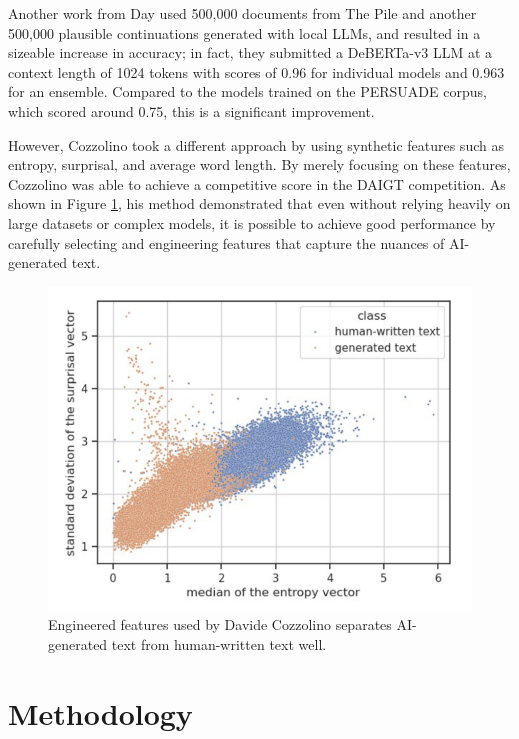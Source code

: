 \documentclass[conference]{IEEEtran}
\begin{document}
Another work from Day \cite{5thplace} used 500,000 documents from The Pile and another 500,000 plausible continuations generated with local LLMs, and resulted in a sizeable increase in accuracy; in fact, they submitted a DeBERTa-v3 LLM at a context length of 1024 tokens with scores of 0.96 for individual models and 0.963 for an ensemble. Compared to the models trained on the PERSUADE corpus, which scored around 0.75, this is a significant improvement.

However, Cozzolino \cite{6thplace} took a different approach by using synthetic features such as entropy, surprisal, and average word length. By merely focusing on these features, Cozzolino was able to achieve a competitive score in the DAIGT competition. As shown in Figure \ref{fig:cozzolino}, his method demonstrated that even without relying heavily on large datasets or complex models, it is possible to achieve good performance by carefully selecting and engineering features that capture the nuances of AI-generated text.

\begin{figure}[htbp]
  \centerline{\includegraphics[width=\columnwidth]{figs/cozzolino.png}}
  \caption{Engineered features used by Davide Cozzolino \cite{6thplace} separates AI-generated text from human-written text well.}
  \label{fig:cozzolino}
\end{figure}

\section{Methodology}
\end{document}

